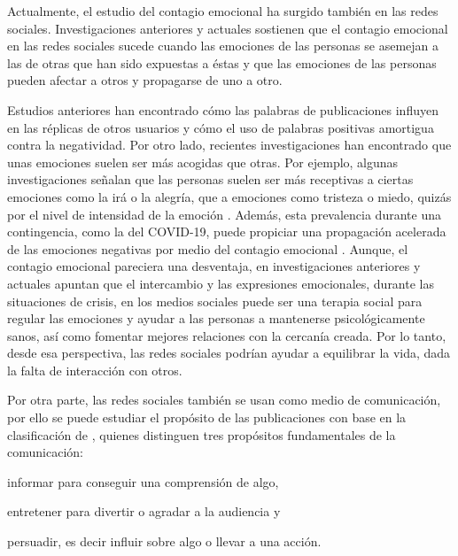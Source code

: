 \documentclass[spanish]{textolivre}
\begin{document}
Actualmente, el estudio del contagio emocional ha surgido también en las redes sociales. Investigaciones anteriores \cite{kramer2014} y actuales \cite{goldenberg2020,steinert2020} sostienen que el contagio emocional en las redes sociales sucede cuando las emociones de las personas se asemejan a las de otras que han sido expuestas a éstas y que las emociones de las personas pueden afectar a otros y propagarse de uno a otro.

Estudios anteriores \cite{kramer2012} han encontrado cómo las palabras de publicaciones influyen en las réplicas de otros usuarios y cómo el uso de palabras positivas amortigua contra la negatividad. Por otro lado, recientes investigaciones han encontrado que unas emociones suelen ser más acogidas que otras. Por ejemplo, algunas investigaciones señalan que las personas suelen ser más receptivas a ciertas emociones como la irá o la alegría, que a emociones como tristeza o miedo, quizás por el nivel de intensidad de la emoción \cite{wang2020,goldenberg2020}. Además, esta prevalencia durante una contingencia, como la del COVID-19, puede propiciar una propagación acelerada de las emociones negativas por medio del contagio emocional \cite{goldenberg2020}. Aunque, el contagio emocional pareciera una desventaja, en investigaciones anteriores \cite{Bazarova2015} y actuales \cite{iglesiasSanchez2020} apuntan que el intercambio y las expresiones emocionales, durante las situaciones de crisis, en los medios sociales puede ser una terapia social para regular las emociones y ayudar a las personas a mantenerse psicológicamente sanos, así como fomentar mejores relaciones con la cercanía creada. Por lo tanto, desde esa perspectiva, las redes sociales podrían ayudar a equilibrar la vida, dada la falta de interacción con otros.

Por otra parte, las redes sociales también se usan como medio de comunicación, por ello se puede estudiar el propósito de las publicaciones con base en la clasificación de \textcite{monroe1973}, quienes distinguen tres propósitos fundamentales de la comunicación: 
\begin{enumerate*}[label=\arabic*)] 
\item informar para conseguir una comprensión de algo, 
\item entretener para divertir o agradar a la audiencia y 
\item persuadir, es decir influir sobre algo o llevar a una acción. 
\end{enumerate*}
\end{document}
